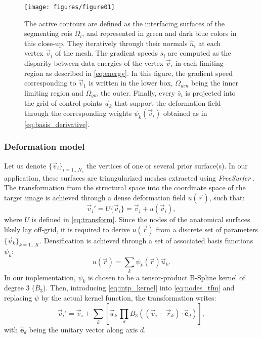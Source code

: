 \begin{figure}
	\texttt{[image: figures/figure01]}
	\caption{The active contours are defined as the interfacing surfaces of the segmenting
	\glspl{roi} $\Omega_i$, and represented in green and dark blue colors in this
	close-up.
	They iteratively through their normals $\hat{n}_i$ at each vertex $\vec{v}_i$ of the mesh.
	The gradient speeds $\bar{s}_i$ are computed as the disparity between data energies of
	the vertex $\vec{v}_i$ in each limiting region as described in \autoref{eq:energy}.
	In this figure, the gradient speed corresponding to $\vec{v}_1$ is written in the lower
	box, $\Omega_{wm}$ being the inner limiting region and $\Omega_{gm}$ the outer.
	Finally, every $\bar{s}_i$ is projected into the grid of control points $\vec{u}_k$ that
	support the deformation field through the corresponding weights $\psi_k(\vec{v}_i)$ obtained
	as in \autoref{eq:basis_derivative}.
	}\label{fig:method}
\end{figure}

\subsubsection{Deformation model}
\label{sec:deformation_model}
Let us denote $\{\vec{v}_i\}_{i=1 \ldots N_c}$ the vertices of one or several prior
  surface(s).
In our application, these surfaces are triangularized meshes extracted using \emph{FreeSurfer}
  \citep{fischl_freesurfer_2012}.
The transformation from the structural space into the coordinate space of the
  target image is achieved through a dense deformation field $u(\vec{r})$, such that:
  \begin{equation}
  \vec{v}_i' = U\{\vec{v}_i\} = \vec{v}_i + u(\vec{v}_i),
  \label{eq:nodes_tfm}
  \end{equation}
  where $U$ is defined in \eqref{eq:transform}.
Since the nodes of the anatomical surfaces likely lay off-grid, it is required to
  derive $u(\vec{r})$ from a discrete set of parameters $\{\vec{u}_k\}_{k=1 \ldots K}$.
Densification is achieved through a set of associated basis functions $\psi_k$:
  \begin{equation}
  u(\vec{r}) = \sum_k \psi_k(\vec{r}) \vec{u}_k.
  \label{eq:intp_kernel}
  \end{equation}
%
In our implementation, $\psi_k$ is chosen to be a tensor-product B-Spline kernel
  of degree 3 ($B_3$).
Then, introducing \eqref{eq:intp_kernel} into \eqref{eq:nodes_tfm} and replacing
  $\psi$ by the actual kernel function, the transformation writes:
  \begin{equation}
    \vec{v}_i' = \vec{v}_i + \sum_k \left[ \vec{u}_k \, \underset{d}{\prod}
      B_3( (\vec{v}_i - \vec{r}_k) \cdot \hat{\mathbf{e}}_d ) \right],
  \label{eq:transformation}
  \end{equation}
  with $\hat{\mathbf{e}}_d$ being the unitary vector along axis $d$.


